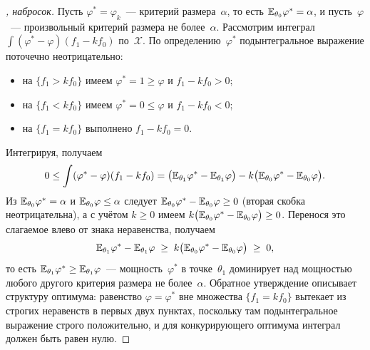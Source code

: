 \begin{proof}[, набросок]
Пусть $\varphi^* = \varphi_k$~--- критерий размера~$\alpha$, то есть $\mathbb{E}_{\theta_0} \varphi^* = \alpha$, и пусть~$\varphi$~--- произвольный критерий размера не более~$\alpha$. Рассмотрим интеграл $\int (\varphi^* - \varphi)(f_1 - k f_0)$ по~$\mathcal{X}$. По определению~$\varphi^*$ подынтегральное выражение поточечно неотрицательно:
\begin{itemize}
  \item на $\{f_1 > k f_0\}$ имеем $\varphi^* = 1 \geq \varphi$ и $f_1 - k f_0 > 0$;
  \item на $\{f_1 < k f_0\}$ имеем $\varphi^* = 0 \leq \varphi$ и $f_1 - k f_0 < 0$;
  \item на $\{f_1 = k f_0\}$ выполнено $f_1 - k f_0 = 0$.
\end{itemize}
Интегрируя, получаем
\[
  0 \leq \int (\varphi^* - \varphi)(f_1 - k f_0) = \bigl(\mathbb{E}_{\theta_1} \varphi^* - \mathbb{E}_{\theta_1} \varphi\bigr) - k \bigl(\mathbb{E}_{\theta_0} \varphi^* - \mathbb{E}_{\theta_0} \varphi\bigr).
\]
Из $\mathbb{E}_{\theta_0} \varphi^* = \alpha$ и $\mathbb{E}_{\theta_0} \varphi \leq \alpha$ следует $\mathbb{E}_{\theta_0} \varphi^* - \mathbb{E}_{\theta_0} \varphi \geq 0$ (вторая скобка неотрицательна), а с учётом $k \geq 0$ имеем $k\bigl(\mathbb{E}_{\theta_0} \varphi^* - \mathbb{E}_{\theta_0} \varphi\bigr) \geq 0$. Перенося это слагаемое влево от знака неравенства, получаем
\[
  \mathbb{E}_{\theta_1} \varphi^* - \mathbb{E}_{\theta_1} \varphi \;\geq\; k\bigl(\mathbb{E}_{\theta_0} \varphi^* - \mathbb{E}_{\theta_0} \varphi\bigr) \;\geq\; 0,
\]
то есть $\mathbb{E}_{\theta_1} \varphi^* \geq \mathbb{E}_{\theta_1} \varphi$~--- мощность~$\varphi^*$ в точке~$\theta_1$ доминирует над мощностью любого другого критерия размера не более~$\alpha$. Обратное утверждение описывает структуру оптимума: равенство $\varphi = \varphi^*$ вне множества $\{f_1 = k f_0\}$ вытекает из строгих неравенств в первых двух пунктах, поскольку там подынтегральное выражение строго положительно, и для конкурирующего оптимума интеграл должен быть равен нулю.
\end{proof}

